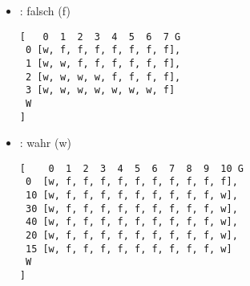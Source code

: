 \documentclass{bschlangaul-aufgabe}
\begin{document}
\begin{enumerate}
\begin{liAdditum}
\begin{itemize}
\begin{verbatim}
[
  [w, f, f, f],
  [w, w, f, f],
  [w, w, w, w],
  [w, w, w, w]
]
\end{verbatim}

\item {}: falsch (f)

\begin{verbatim}
[   0  1  2  3  4  5  6  7 G
 0 [w, f, f, f, f, f, f, f],
 1 [w, w, f, f, f, f, f, f],
 2 [w, w, w, w, f, f, f, f],
 3 [w, w, w, w, w, w, w, f]
 W
]
\end{verbatim}

\item {}: wahr (w)

\begin{verbatim}
[    0  1  2  3  4  5  6  7  8  9  10 G
 0  [w, f, f, f, f, f, f, f, f, f, f],
 10 [w, f, f, f, f, f, f, f, f, f, w],
 30 [w, f, f, f, f, f, f, f, f, f, w],
 40 [w, f, f, f, f, f, f, f, f, f, w],
 20 [w, f, f, f, f, f, f, f, f, f, w],
 15 [w, f, f, f, f, f, f, f, f, f, w]
 W
]
\end{verbatim}
\end{itemize}

\end{liAdditum}
\end{enumerate}
\end{document}

